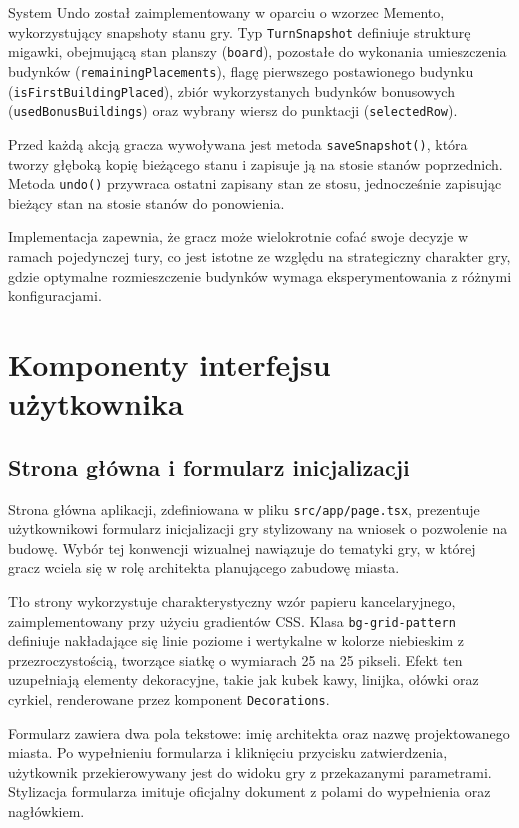 \documentclass[12pt, a4paper]{article}
\begin{document}
System Undo został zaimplementowany w oparciu o wzorzec Memento, wykorzystujący snapshoty stanu gry. Typ \texttt{TurnSnapshot} definiuje strukturę migawki, obejmującą stan planszy (\texttt{board}), pozostałe do wykonania umieszczenia budynków (\texttt{remainingPlacements}), flagę pierwszego postawionego budynku (\texttt{isFirstBuildingPlaced}), zbiór wykorzystanych budynków bonusowych (\texttt{usedBonusBuildings}) oraz wybrany wiersz do punktacji (\texttt{selectedRow}).

Przed każdą akcją gracza wywoływana jest metoda \texttt{saveSnapshot()}, która tworzy głęboką kopię bieżącego stanu i zapisuje ją na stosie stanów poprzednich. Metoda \texttt{undo()} przywraca ostatni zapisany stan ze stosu, jednocześnie zapisując bieżący stan na stosie stanów do ponowienia.

Implementacja zapewnia, że gracz może wielokrotnie cofać swoje decyzje w ramach pojedynczej tury, co jest istotne ze względu na strategiczny charakter gry, gdzie optymalne rozmieszczenie budynków wymaga eksperymentowania z różnymi konfiguracjami.

\section{Komponenty interfejsu użytkownika}

\subsection{Strona główna i formularz inicjalizacji}

Strona główna aplikacji, zdefiniowana w pliku \texttt{src/app/page.tsx}, prezentuje użytkownikowi formularz inicjalizacji gry stylizowany na wniosek o pozwolenie na budowę. Wybór tej konwencji wizualnej nawiązuje do tematyki gry, w której gracz wciela się w rolę architekta planującego zabudowę miasta.

Tło strony wykorzystuje charakterystyczny wzór papieru kancelaryjnego, zaimplementowany przy użyciu gradientów CSS. Klasa \texttt{bg-grid-pattern} definiuje nakładające się linie poziome i wertykalne w kolorze niebieskim z przezroczystością, tworzące siatkę o wymiarach 25 na 25 pikseli. Efekt ten uzupełniają elementy dekoracyjne, takie jak kubek kawy, linijka, ołówki oraz cyrkiel, renderowane przez komponent \texttt{Decorations}.

Formularz zawiera dwa pola tekstowe: imię architekta oraz nazwę projektowanego miasta. Po wypełnieniu formularza i kliknięciu przycisku zatwierdzenia, użytkownik przekierowywany jest do widoku gry z przekazanymi parametrami. Stylizacja formularza imituje oficjalny dokument z polami do wypełnienia oraz nagłówkiem.
\end{document}
